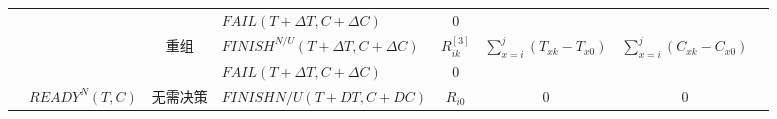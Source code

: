 \begin{table}[htbp]
\begin{tabular}{rrrrrrrr}
        \multicolumn{1}{c|}{} 
        &       
        & \multicolumn{1}{|c}{} 
        & \multicolumn{1}{|l}{$FAIL(T+\Delta T,C+\Delta C)$} 
        & \multicolumn{1}{|c}{0} 
        & \multicolumn{1}{|c}{} 
        & \multicolumn{1}{|c}{} \\
        \cline{3-7}

        \multicolumn{1}{c|}{} 
        &       
        & \multicolumn{1}{|c}{\multirow{2}{*}{重组}} 
        & \multicolumn{1}{|l}{$FINISH^{N/U}(T+\Delta T,C+\Delta C)$} 
        & \multicolumn{1}{|c}{$R_{ik}^{[3]}$} 
        & \multicolumn{1}{|c}{\multirow{2}{*}{$\sum\limits_{x = i}^j {({T_{xk}} - {T_{x0}})} $}}
        & \multicolumn{1}{|c}{\multirow{2}{*}{$\sum\limits_{x = i}^j {({C_{xk}} - {C_{x0}})} $}} \\

        \multicolumn{1}{c|}{} 
        &       
        & \multicolumn{1}{|c}{} 
        & \multicolumn{1}{|l}{$FAIL(T+\Delta T,C+\Delta C)$} 
        & \multicolumn{1}{|c}{0} 
        & \multicolumn{1}{|c}{}
        & \multicolumn{1}{|c}{} \\
        \cline{2-7}

        \multicolumn{1}{c|}{} 
        & \multirow{2}{*}{$READY^N(T,C)$} 
        & \multicolumn{1}{|c}{\multirow{2}{*}{无需决策}} 
        & \multicolumn{1}{|l}{$FINISHN/U(T+DT,C+DC)$} 
        & \multicolumn{1}{|c}{$R_{i0}$} 
        & \multicolumn{1}{|c}{\multirow{2}[4]{*}{0}} 
        & \multicolumn{1}{|c}{\multirow{2}[4]{*}{0}} \\
        \cline{3-7}



\end{tabular}
\end{table}
